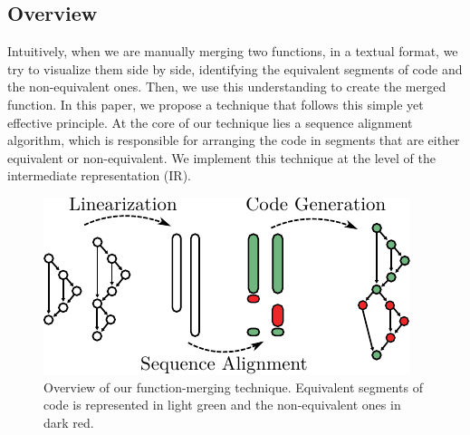 \subsection{Overview}
Intuitively, when we are manually merging two functions, in a textual format, we try to visualize them side by side, identifying the
equivalent segments of code and the non-equivalent ones. Then, we use this understanding to create the merged function. In this paper, we
propose a technique that follows this simple yet effective principle. At the core of our technique lies a sequence alignment algorithm,
which is responsible for arranging the code in segments that are either equivalent or non-equivalent.
We implement this technique at the level of the intermediate representation (IR).

\begin{figure}[t!]
  \centering
  \includegraphics[width=0.85\linewidth]{figs/func-merge-overview.pdf}
  \caption{Overview of our function-merging technique.
           Equivalent segments of code is represented in light green and the non-equivalent ones in dark red.}

  \label{fig:func-merge-overview}
\end{figure}


